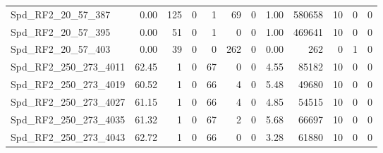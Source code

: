 \begin{longtable}[c]{@{}lrrrrrrrrrrr@{}}
Spd\_RF2\_20\_57\_387        & 0.00                   & 125                     & 0                       & 1                      & 69                      & 0                       & 1.00                    & 580658                   & 10                       & 0                        & 0                        \\
Spd\_RF2\_20\_57\_395        & 0.00                   & 51                      & 0                       & 1                      & 0                       & 0                       & 1.00                    & 469641                   & 10                       & 0                        & 0                        \\
Spd\_RF2\_20\_57\_403        & 0.00                   & 39                      & 0                       & 0                      & 262                     & 0                       & 0.00                    & 262                      & 0                        & 1                        & 0                        \\
Spd\_RF2\_250\_273\_4011     & 62.45                  & 1                       & 0                       & 67                     & 0                       & 0                       & 4.55                    & 85182                    & 10                       & 0                        & 0                        \\
Spd\_RF2\_250\_273\_4019     & 60.52                  & 1                       & 0                       & 66                     & 4                       & 0                       & 5.48                    & 49680                    & 10                       & 0                        & 0                        \\
Spd\_RF2\_250\_273\_4027     & 61.15                  & 1                       & 0                       & 66                     & 4                       & 0                       & 4.85                    & 54515                    & 10                       & 0                        & 0                        \\
Spd\_RF2\_250\_273\_4035     & 61.32                  & 1                       & 0                       & 67                     & 2                       & 0                       & 5.68                    & 66697                    & 10                       & 0                        & 0                        \\
Spd\_RF2\_250\_273\_4043     & 62.72                  & 1                       & 0                       & 66                     & 0                       & 0                       & 3.28                    & 61880                    & 10                       & 0                        & 0                        \\

\end{longtable}

